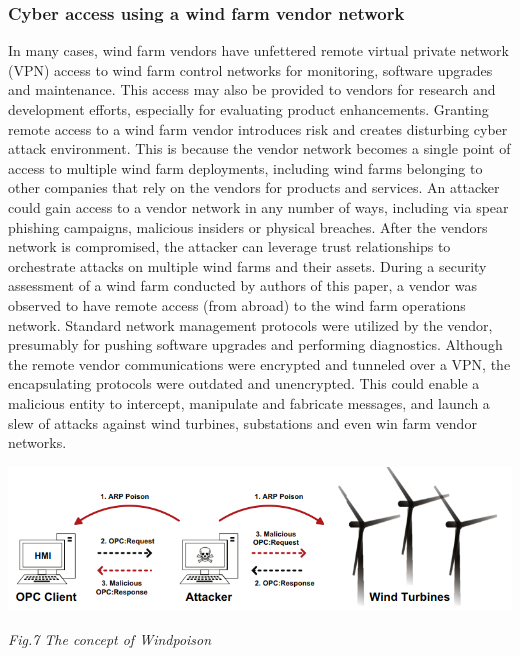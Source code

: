 \documentclass[twosided,a4,10pt]{article}
\begin{document}
\begin{multicols}{2}
 \subsubsection{Cyber access using a wind farm vendor network}
 In many cases, wind farm vendors have unfettered remote virtual private network (VPN) access to wind farm control networks for monitoring, software upgrades and maintenance. This access may also be provided to vendors for research and development efforts, especially for evaluating product enhancements. Granting remote access to a wind farm vendor introduces risk and creates disturbing cyber attack environment. This is because the vendor network becomes a single point of access to multiple wind farm deployments, including wind farms belonging to other companies that rely on the vendors for products and services. An attacker could gain access to a vendor network in any number of ways, including via spear phishing campaigns, malicious insiders or physical breaches. After the vendors network is compromised, the attacker can leverage trust relationships to orchestrate attacks on multiple wind farms and their assets. During a security assessment of a wind farm conducted by authors of this paper, a vendor was observed to have remote access (from abroad) to the wind farm operations network. Standard network management protocols were utilized by the vendor, presumably for pushing software upgrades and performing diagnostics. Although the remote vendor communications were encrypted and tunneled over a VPN, the encapsulating protocols were outdated and unencrypted. This could enable a malicious entity to intercept, manipulate and fabricate messages, and launch a slew of attacks against wind turbines, substations and even win farm vendor networks.
 
\end{multicols}
\includegraphics{cache_poison}
\begin{center}
	\textit{Fig.7 The concept of Windpoison}
\end{center}
\end{document}
